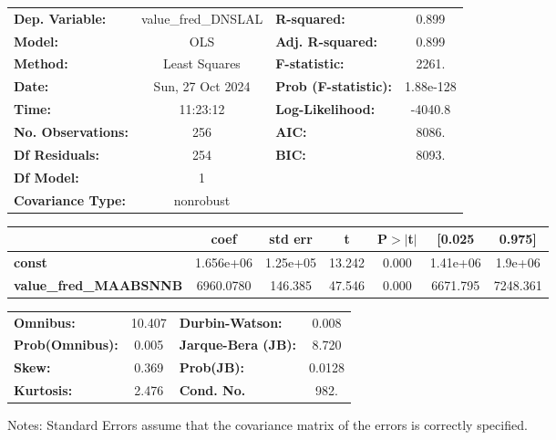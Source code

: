 \begin{center}
\begin{tabular}{lclc}
\toprule
\textbf{Dep. Variable:}        & value\_fred\_DNSLAL & \textbf{  R-squared:         } &     0.899   \\
\textbf{Model:}                &         OLS         & \textbf{  Adj. R-squared:    } &     0.899   \\
\textbf{Method:}               &    Least Squares    & \textbf{  F-statistic:       } &     2261.   \\
\textbf{Date:}                 &   Sun, 27 Oct 2024  & \textbf{  Prob (F-statistic):} & 1.88e-128   \\
\textbf{Time:}                 &       11:23:12      & \textbf{  Log-Likelihood:    } &   -4040.8   \\
\textbf{No. Observations:}     &           256       & \textbf{  AIC:               } &     8086.   \\
\textbf{Df Residuals:}         &           254       & \textbf{  BIC:               } &     8093.   \\
\textbf{Df Model:}             &             1       & \textbf{                     } &             \\
\textbf{Covariance Type:}      &      nonrobust      & \textbf{                     } &             \\
\bottomrule
\end{tabular}
\begin{tabular}{lcccccc}
                               & \textbf{coef} & \textbf{std err} & \textbf{t} & \textbf{P$> |$t$|$} & \textbf{[0.025} & \textbf{0.975]}  \\
\midrule
\textbf{const}                 &    1.656e+06  &     1.25e+05     &    13.242  &         0.000        &     1.41e+06    &      1.9e+06     \\
\textbf{value\_fred\_MAABSNNB} &    6960.0780  &      146.385     &    47.546  &         0.000        &     6671.795    &     7248.361     \\
\bottomrule
\end{tabular}
\begin{tabular}{lclc}
\textbf{Omnibus:}       & 10.407 & \textbf{  Durbin-Watson:     } &    0.008  \\
\textbf{Prob(Omnibus):} &  0.005 & \textbf{  Jarque-Bera (JB):  } &    8.720  \\
\textbf{Skew:}          &  0.369 & \textbf{  Prob(JB):          } &   0.0128  \\
\textbf{Kurtosis:}      &  2.476 & \textbf{  Cond. No.          } &     982.  \\
\bottomrule
\end{tabular}
\end{center}

Notes: \newline
 [1] Standard Errors assume that the covariance matrix of the errors is correctly specified.